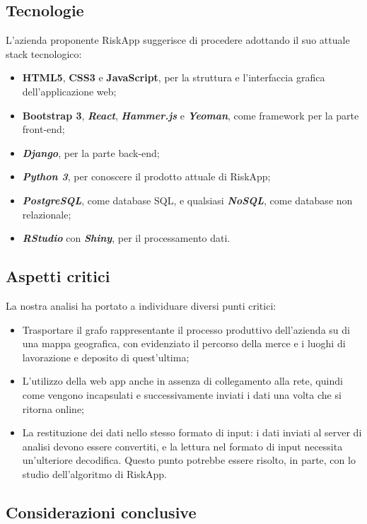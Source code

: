 \subsection{Tecnologie}
L'azienda proponente RiskApp suggerisce di procedere adottando il suo attuale stack tecnologico:
\begin{itemize}
	\item \textbf{HTML5}, \textbf{CSS3} e \textbf{JavaScript}, per la struttura e l'interfaccia grafica dell'applicazione web;
	\item \textbf{Bootstrap 3}, \textbf{\textit{React}}, \textbf{\textit{Hammer.js}} e \textbf{\textit{Yeoman}}, come framework per la parte front-end;
	\item \textbf{\textit{Django}}, per la parte back-end;
	\item \textbf{\textit{Python 3}}, per conoscere il prodotto attuale di RiskApp;
	\item \textbf{\textit{PostgreSQL}}, come database SQL, e qualsiasi \textbf{\textit{NoSQL}}, come database non relazionale;
	\item \textbf{\textit{RStudio}} con \textbf{\textit{Shiny}}, per il processamento dati.
\end{itemize}

\subsection{Aspetti critici}

La nostra analisi ha portato a individuare diversi punti critici:
\begin{itemize}
	\item Trasportare il grafo rappresentante il processo produttivo dell’azienda su di una mappa geografica, con evidenziato il percorso della merce e i luoghi di lavorazione e deposito di quest'ultima;
	\item L'utilizzo della web app anche in assenza di collegamento alla rete, quindi come vengono incapsulati e successivamente inviati i dati una volta che si ritorna online;
	\item La restituzione dei dati nello stesso formato di input: i dati inviati al server di analisi devono essere convertiti, e la lettura nel formato di input necessita un'ulteriore decodifica. Questo punto potrebbe essere risolto, in parte, con lo studio dell’algoritmo di RiskApp.
\end{itemize}

\subsection{Considerazioni conclusive}

